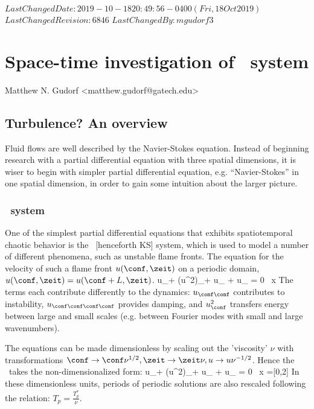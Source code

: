 {$LastChangedDate: 2019-10-18 20:49:56 -0400 (Fri, 18 Oct 2019) $}
{$LastChangedRevision: 6846 $} {$LastChangedBy: mgudorf3 $}

\chapter{Space-time investigation of \KS\ system}
\label{chap:reportMNG}

\bigskip

\hfill {\large Matthew N. Gudorf <matthew.gudorf@gatech.edu>}


\section{Turbulence? An overview}
\label{sect:MNGintro}

Fluid flows are well described by the Navier-Stokes equation. Instead of
beginning research with a partial differential equation with three
spatial dimensions, it is wiser to begin with simpler partial
differential equation, e.g. ``Navier-Stokes'' in one spatial dimension,
in order to gain some intuition about the larger picture.

\subsection{\KS\ system}
\label{sect:KSsyss}

One of the simplest partial differential equations that exhibits
spatiotemporal chaotic behavior is the \KS\ [henceforth KS]
system, which is used to model a number of different
phenomena, such as unstable flame fronts. The equation for the velocity
of such a flame front
$u(\conf, \zeit)$ on a periodic domain, $u(\conf, \zeit)= u(\conf + L,
\zeit)$.
\beq
    u_\zeit + (u^2)_\conf + u_{\conf \conf} + \nu u_{\conf \conf \conf \conf} = 0 \, \quad x \in [0, L]
\eeq
The terms each contribute differently to the dynamics: $u_{\conf \conf}$
contributes to instability, $u_{\conf \conf \conf \conf}$ provides
damping, and $u^2_{\conf}$ transfers energy between large and small
scales (e.g. between Fourier modes with small and large wavenumbers).

The equations can be made dimensionless by scaling out the 'viscosity'
$\nu$ with transformations $\conf \rightarrow \conf\nu^{1/2}, \zeit
\rightarrow \zeit\nu , u \rightarrow u\nu^{-1/2}$. Hence the
\KSe\ takes the non-dimensionalized form:
\beq
     u_\zeit + (u^2)_\conf + u_{\conf \conf}
     + u_{\conf \conf \conf \conf} = 0 \, \quad x \in [0, L\nu^{-1/2}]=[0,2\pi\tildeL]
In these dimensionless units, periods of periodic solutions are also
rescaled following the relation: $T_p = \frac{T^{*}_p}{\nu}$.

